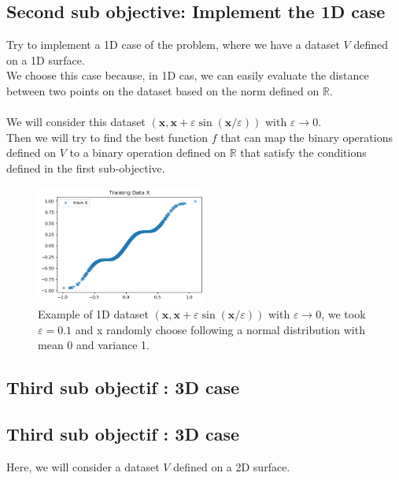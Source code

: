 \documentclass{report}
\begin{document}
        \subsection*{Second sub objective: Implement the 1D case}
            Try to implement a 1D case of the problem, where we have a dataset $V$ defined on a 1D surface.
            \\ 
            We choose this case because, in 1D cas, we can easily evaluate the distance between two points on the dataset based on the norm defined on $\mathbb{R}$.
            \\
            \\
            We will consider this dataset 
            $(\mathbf{x}, \mathbf{x}+\varepsilon \sin (\mathbf{x} / \varepsilon))$ with $\varepsilon \rightarrow 0$.
            \\
            Then we will try to find the best function $f$ that can map the binary operations defined on $V$ to a binary operation defined on $\mathbb{R}$ that satisfy the conditions defined in the first sub-objective.
            \newpage
            \begin{figure}
                \centering
                \includegraphics[width=0.5\textwidth]{./images/M.png}
                \caption{Example of 1D dataset  $(\mathbf{x}, \mathbf{x}+\varepsilon \sin (\mathbf{x} / \varepsilon))$ with $\varepsilon \rightarrow 0$, we took $\varepsilon = 0.1$ and x randomly choose following a normal distribution with mean 0 and variance 1.} 
            \end{figure}

        \subsection*{Third sub objectif : 3D case}
        \subsection*{Third sub objectif : 3D case}
            Here, we will consider a dataset $V$ defined on a 2D surface.
\end{document}
